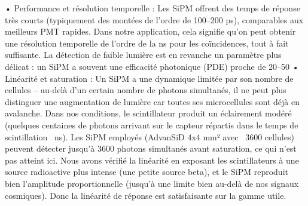 \documentclass[a4paper,12pt,twoside]{article}
\begin{document}
	•	Performance et résolution temporelle : Les SiPM offrent des temps de réponse très courts (typiquement des montées de l’ordre de 100–200 ps), comparables aux meilleurs PMT rapides. Dans notre application, cela signifie qu’on peut obtenir une résolution temporelle de l’ordre de la ns pour les coïncidences, tout à fait suffisante. La détection de faible lumière est en revanche un paramètre plus délicat : un SiPM a souvent une efficacité photonique (PDE) proche de 20–50%
	•	Linéarité et saturation : Un SiPM a une dynamique limitée par son nombre de cellules – au-delà d’un certain nombre de photons simultanés, il ne peut plus distinguer une augmentation de lumière car toutes ses microcellules sont déjà en avalanche. Dans nos conditions, le scintillateur produit un éclairement modéré (quelques centaines de photons arrivant sur le capteur répartis dans le temps de scintillation ~ns). Les SiPM employés (AdvanSiD 4x4 mm² avec ~3600 cellules) peuvent détecter jusqu’à 3600 photons simultanés avant saturation, ce qui n’est pas atteint ici. Nous avons vérifié la linéarité en exposant les scintillateurs à une source radioactive plus intense (une petite source beta), et le SiPM reproduit bien l’amplitude proportionnelle (jusqu’à une limite bien au-delà de nos signaux cosmiques). Donc la linéarité de réponse est satisfaisante sur la gamme utile.
\end{document}
